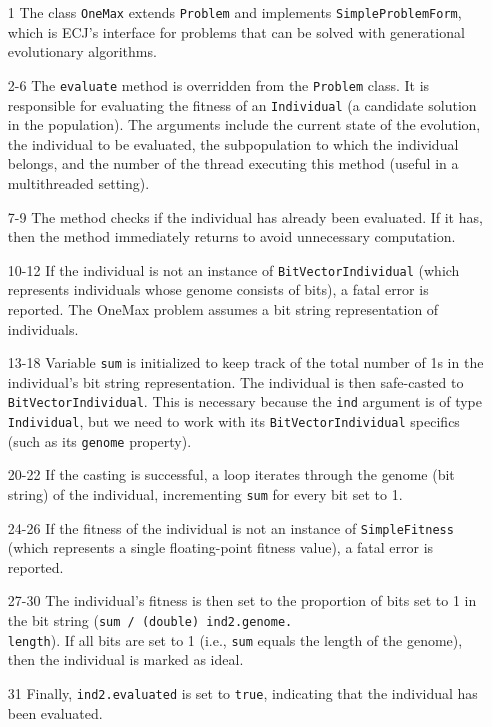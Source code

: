   \begin{enumerate}
    \item[1] The class \texttt{OneMax} extends \texttt{Problem} and implements 
      \texttt{SimpleProblemForm}, which is ECJ's interface for problems that 
      can be solved with generational evolutionary algorithms.
    \item[2-6] The \texttt{evaluate} method is overridden from the
      \texttt{Problem} class.
      It is responsible for evaluating the fitness of an \texttt{Individual} (a 
      candidate solution in the population).
      The arguments include the current state of the evolution, the individual 
      to be evaluated, the subpopulation to which the individual belongs, and 
      the number of the thread executing this method (useful in a multithreaded 
      setting).
    \item[7-9] The method checks if the individual has already been evaluated.
      If it has, then the method immediately returns to avoid unnecessary 
      computation.
    \item[10-12] If the individual is not an instance of 
      \texttt{BitVectorIndividual} (which represents individuals whose genome 
      consists of bits), a fatal error is reported.
      The OneMax problem assumes a bit string representation of individuals.
    \item[13-18] Variable \texttt{sum} is initialized to keep track of the 
      total number of 1s in the individual's bit string representation.
      The individual is then safe-casted to \texttt{BitVectorIndividual}.
      This is necessary because the \texttt{ind} argument is of type
      \texttt{Individual}, but we need to work with its
      \texttt{BitVectorIndividual} specifics (such as its \texttt{genome} 
      property).
    \item[20-22] If the casting is successful, a loop iterates through the 
      genome (bit string) of the individual, incrementing \texttt{sum} for 
      every bit set to 1.
    \item[24-26] If the fitness of the individual is not an instance of 
      \texttt{SimpleFitness} (which represents a single floating-point fitness 
      value), a fatal error is reported.
    \item[27-30] The individual's fitness is then set to the proportion of bits 
      set to 1 in the bit string 
      (\texttt{sum / (double) ind2.genome.}\\
      \texttt{length}).
      If all bits are set to 1 (i.e., \texttt{sum} equals the length of the 
      genome), then the individual is marked as ideal.
    \item[31] Finally, \texttt{ind2.evaluated} is set to \texttt{true}, 
      indicating that the individual has been evaluated.
  \end{enumerate}

